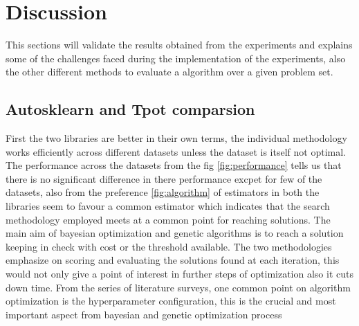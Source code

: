 \chapter{Discussion}\label{chap:discussion}

This sections will validate the results obtained from the experiments and explains some of the challenges faced during the implementation of the experiments, also the other different methods to evaluate a algorithm over a given problem set.

\section{Autosklearn and Tpot comparsion}

First the two libraries are better in their own terms, the individual methodology works efficiently across different datasets unless the dataset is itself not optimal. The performance across the datasets from the fig \ref{fig:performance} tells us that there is no significant difference in there performance excpet for few of the datasets, also from the preference \ref{fig:algorithm} of estimators in both the libraries seem to favour a common estimator which indicates that the search methodology employed meets at a common point for reaching solutions. The main aim of bayesian optimization and genetic algorithms is to reach a solution keeping in check with cost or the threshold available. The two methodologies emphasize on scoring and evaluating the solutions found at each iteration, this would not only give a point of interest in further steps of optimization also it cuts down time. From the series of literature surveys, one common point on algorithm optimization is the hyperparameter configuration, this is the crucial and most important aspect from bayesian and genetic optimization process

